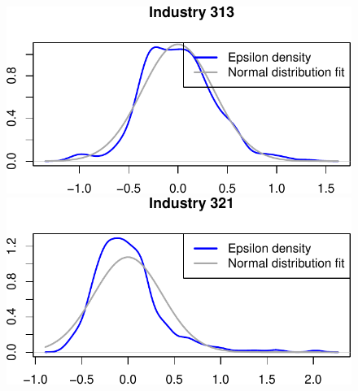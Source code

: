 \documentclass[
  12pt]{article}
\theoremstyle{definition}
\theoremstyle{remark}
\begin{document}
\begin{figure}
\begin{minipage}{\linewidth}
\includegraphics{Tax-Prod_files/figure-pdf/unnamed-chunk-44-4.pdf}

\includegraphics{Tax-Prod_files/figure-pdf/unnamed-chunk-44-5.pdf}

\end{minipage}%

\end{figure}%
\end{document}
